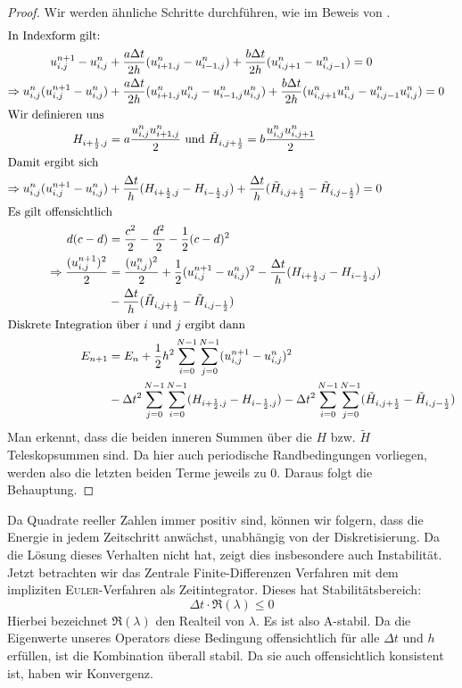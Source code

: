 \documentclass[12pt,a4paper]{scrartcl}
\numberwithin{equation}{section} %
\theoremstyle{definition}
\theoremstyle{plain}
\begin{document}
\begin{proof}
Wir werden ähnliche Schritte  durchführen, wie im Beweis von .
\begin{align*}
\intertext{In Indexform gilt:}
u_{i,j}^{n+1}-u_{i,j}^n&+\frac{a\Delta t}{2h}(u_{i+1,j}^n-u_{i-1,j}^n)+\frac{b\Delta t}{2h	}(u_{i,j+1}^n-u_{i,j-1}^n)=0\\
\Rightarrow u_{i,j}^n(u_{i,j}^{n+1}-u_{i,j}^n)&+\frac{a\Delta t}{2h}(u_{i+1,j}^nu_{i,j}^n-u_{i-1,j}^nu_{i,j}^n)+\frac{b\Delta t}{2h	}(u_{i,j+1}^nu_{i,j}^n-u_{i,j-1}^nu_{i,j}^n)=0\\
\intertext{Wir definieren uns }
H_{i+\frac{1}{2},j}&=a\frac{u_{i,j}^nu_{i+1,j}^n}{2} \text{ und }\tilde{H}_{i,j+\frac{1}{2}}=b\frac{u_{i,j}^nu_{i,j+1}^n}{2}\\
\intertext{Damit ergibt sich }
\Rightarrow u_{i,j}^n(u_{i,j}^{n+1}-u_{i,j}^n)&+\frac{\Delta t}{h}(H_{i+\frac{1}{2},j}-H_{i-\frac{1}{2},j})+\frac{\Delta t}{h}(\tilde{H}_{i,j+\frac{1}{2}}-\tilde{H}_{i,j-\frac{1}{2}})=0\\
\intertext{Es gilt offensichtlich }
d(c-d)&=\frac{c^2}{2}-\frac{d^2}{2}-\frac{1}{2}(c-d)^2\\
\Rightarrow \frac{(u_{i,j}^{n+1})^2}{2}&=\frac{(u_{i,j}^n)^2}{2}+\frac{1}{2}(u_{i,j}^{n+1}-u_{i,j}^n)^2-\frac{\Delta t}{h}(H_{i+\frac{1}{2},j}-H_{i-\frac{1}{2},j})\\&-\frac{\Delta t}{h}(\tilde{H}_{i,j+\frac{1}{2}}-\tilde{H}_{i,j-\frac{1}{2}})\\
\intertext{Diskrete Integration über $i$ und $j$ ergibt dann }
E_{n+1}&=E_n+\frac{1}{2}h^2\sum_{i=0}^{N-1}\sum_{j=0}^{N-1}(u_{i,j}^{n+1}-u_{i,j}^n)^2\\
&-\Delta t^2\sum_{j=0}^{N-1}\sum_{i=0}^{N-1}(H_{i+\frac{1}{2},j}-H_{i-\frac{1}{2},j})-\Delta t^2\sum_{i=0}^{N-1}\sum_{j=0}^{N-1}(\tilde{H}_{i,j+\frac{1}{2}}-\tilde{H}_{i,j-\frac{1}{2}})\\
\end{align*}
Man erkennt, dass die beiden inneren Summen über die $H$ bzw. $\tilde{H}$ Teleskopsummen sind. Da hier auch periodische Randbedingungen vorliegen, werden also die letzten beiden Terme jeweils zu $0$. Daraus folgt die Behauptung.
\end{proof} Da Quadrate reeller Zahlen immer positiv sind, können wir folgern, dass die Energie in jedem Zeitschritt anwächst, unabhängig von der Diskretisierung. Da die Lösung dieses Verhalten nicht hat, zeigt dies insbesondere auch Instabilität.
Jetzt betrachten wir das Zentrale Finite-Differenzen Verfahren mit dem impliziten \textsc{Euler}-Verfahren als Zeitintegrator. Dieses hat Stabilitätsbereich:
\begin{equation}
\Delta t\cdot\Re(\lambda)\le 0
\end{equation}
Hierbei bezeichnet $\Re(\lambda)$ den Realteil von $\lambda$. Es ist also A-stabil. Da die Eigenwerte unseres Operators diese Bedingung offensichtlich für alle $\Delta t$ und $h$ erfüllen, ist die Kombination überall stabil. Da sie auch offensichtlich konsistent ist, haben wir Konvergenz. 
\end{document}

